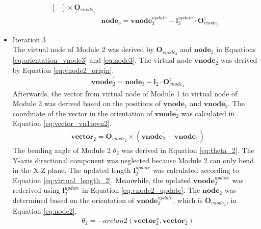 \begin{itemize}
\begin{align}
\begin{bmatrix}
        \end{bmatrix}  
        \times \textbf{O}_{vnode_4}
        \label{eq:orientation_vnode3} \\
        &\textbf{node}_3 = \textbf{vnode}_{3}^{update} - \textbf{l}_{3}^{update} \cdot \textbf{O}_{vnode_3}^{z}
        \label{eq:node3} 
    \end{align}
    \vspace{-15mm}
    \item Iteration 3 \\ %
    The virtual node of Module 2 was derived by $\textbf{O}_{vnode_3}$ and $\textbf{node}_{3}$ in Equations 
    \ref{eq:orientation_vnode3} and \ref{eq:node3}. The virtual node $\textbf{vnode}_{2}$ was derived by Equation 
    \ref{eq:vnode2_origin}.
    \vspace{-5mm}
    \begin{align}
        &\textbf{vnode}_{2}^{'} = \textbf{node}_{3} - \textbf{l}_{2} \cdot \textbf{O}_{vnode_3}^{z}
        \label{eq:vnode2_origin}
    \end{align}
    Afterwards, the vector from virtual node of Module 1 to virtual node of Module 2 was derived based on the 
    positions of $\textbf{vnode}_{1}$ and $\textbf{vnode}_{2}^{'}$. The coordinate of the vector in the orientation 
    of $\textbf{vnode}_{2}^{'}$ was calculated in Equation \ref{eq:vector_vn1tovn2}. 
    \vspace{-5mm}
    \begin{align}
        &\textbf{vector}_{2} = \textbf{O}_{vnode_2} \times (\textbf{vnode}_{2}^{'} - \textbf{vnode}_{1}) 
        \label{eq:vector_vn1tovn2} 
    \end{align}
    The bending angle of Module 2 $\theta_2$ was derived in Equation \ref{eq:theta_2}. The Y-axis directional 
    component was neglected because Module 2 can only bend in the X-Z plane. The updated length $\textbf{l}_{2}^{update}$ 
    was calculated according to Equation \ref{eq:virtual_length_2}. Meanwhile, the updated 
    $\textbf{vnode}_{2}^{update}$ was rederived using $\textbf{l}_{2}^{update}$ in Equation \ref{eq:vnode2_update}. 
    The $\textbf{node}_2$ was determined based on the orientation of $\textbf{vnode}_{2}^{update}$, 
    which is $\textbf{O}_{vnode_2}$, in Equation \ref{eq:node2}.
    \vspace{-5mm}
    \begin{align}
        &\theta_2 = -arctan2(\textbf{vector}_{2}^{x},\textbf{vector}_{2}^{z})
        \label{eq:theta_2} \\

\end{align}
\end{itemize}
